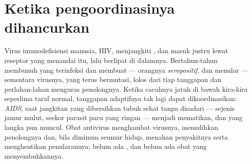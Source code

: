 \section{Ketika pengoordinasinya dihancurkan}

\begin{proposition}\label{prop:g12:adaptive-immunity:hiv}
Virus imunodefisiensi manusia, HIV, menjangkiti , dan
masuk justru lewat reseptor yang menandai  itu, lalu berlipat di
dalamnya. Bertahun-tahun  membunuh  yang terinfeksi
dan membuat  --- orangnya \emph{seropositif}, dan menular ---
sementara virusnya, yang terus bermutasi, lolos dari tiap tanggapan
dan perlahan-lahan menguras  penolongnya. Ketika cacahnya jatuh di
bawah kira-kira seperlima taraf normal, tanggapan adaptifnya tak lagi
dapat dikoordinasikan: \emph{AIDS}, saat jangkitan yang
dibersihkan tubuh sehat tanpa disadari --- sejenis jamur mulut, seekor
parasit paru yang ringan --- menjadi mematikan, dan  yang langka
pun muncul. Obat antivirus menghambat  virusnya, memulihkan 
penolongnya dan, bila diminum seumur hidup, menahan penyakitnya serta
menghentikan penularannya; belum ada , dan belum ada obat
yang menyembuhkannya.
\end{proposition}
\admitted

